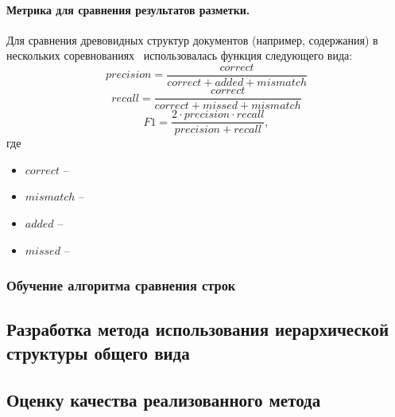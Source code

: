 \paragraph{Метрика для сравнения результатов разметки.} Для сравнения древовидных структур документов (например, содержания) в нескольких соревнованиях~\cite{doucet2013icdar,fintoc2019,fintoc2020,el2021financial} использовалась функция следующего вида:
\[ precision = \frac{correct}{correct + added + mismatch} \]
\[ recall = \frac{correct}{correct + missed + mismatch} \]
\[ F1 = \frac{2 \cdot precision \cdot recall}{precision + recall}, \]
где
\begin{itemize}
    \item $correct$ --
    \item $mismatch$ --
    \item $added$ --
    \item $missed$ --
\end{itemize}

\subsubsection{Обучение алгоритма сравнения строк}


\subsection{Разработка метода использования иерархической структуры общего вида}
\label{subsec:usemethod}


\subsection{Оценку качества реализованного метода}
\label{subsec:evaluation}